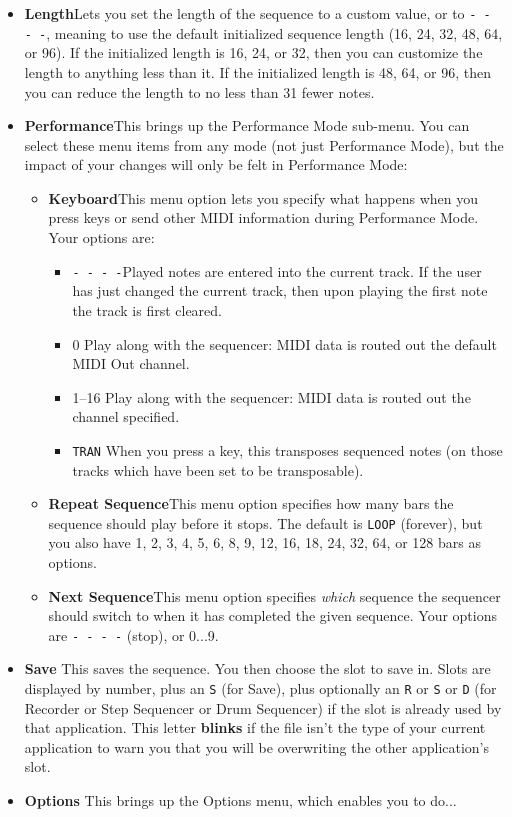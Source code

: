 \documentclass{article}
\begin{document}
\begin{itemize}
\item {\bf Length}\quad  Lets you set the length of the sequence to a custom value, or to \texttt{- - - -}, meaning to use the default initialized sequence length (16, 24, 32, 48, 64, or 96).  If the initialized length is 16, 24, or 32, then you can customize the length to anything less than it.  If the initialized length is 48, 64, or 96, then you can reduce the length to no less than 31 fewer notes.

\item {\bf Performance}\quad  This brings up the Performance Mode sub-menu.  You can select these menu items from any mode (not just Performance Mode), but the impact of your changes will only be felt in Performance Mode:

\begin{itemize}
\item {\bf Keyboard}\quad  This menu option lets you specify what happens when you press keys or send other MIDI information during Performance Mode.  Your options are:

 \renewcommand\labelitemiii{$\diamond$}
\begin{itemize}
	\item {\texttt{-~-~-~-}}\quad Played notes are entered into the current track.  If the user has just changed the current track, then upon playing the first note the track is first cleared.
	\item {0} \quad Play along with the sequencer: MIDI data is routed out the default MIDI Out channel.
	\item {1--16} \quad Play along with the sequencer: MIDI data is routed out the channel specified.
	\item {\texttt{TRAN}} \quad When you press a key, this transposes sequenced notes (on those tracks which have been set to be transposable).
\end{itemize}

\item {\bf Repeat Sequence}\quad This menu option specifies how many bars the sequence should play before it stops.  The default is {\tt LOOP} (forever), but you also have 1, 2, 3, 4, 5, 6, 8, 9, 12, 16, 18, 24, 32, 64, or 128 bars as options.
\item {\bf Next Sequence}\quad This menu option specifies {\it which} sequence the sequencer should switch to when it has completed the given sequence.  Your options are {\tt - - - -} (stop), or 0...9.
\end{itemize} 

\item {\bf Save} \quad This saves the sequence. You then choose the slot to save in.  Slots are displayed by number, plus an \texttt{S} (for Save), plus optionally an \texttt{R} or \texttt{S} or \texttt{D} (for Recorder or Step Sequencer or Drum Sequencer) if the slot is already used by that application.  This letter {\bf blinks} if the file isn't the type of your current application to warn you that you will be overwriting the other application's slot.

\item {\bf Options} \quad This brings up the Options menu, which enables you to do...
\end{itemize}
\end{document}
